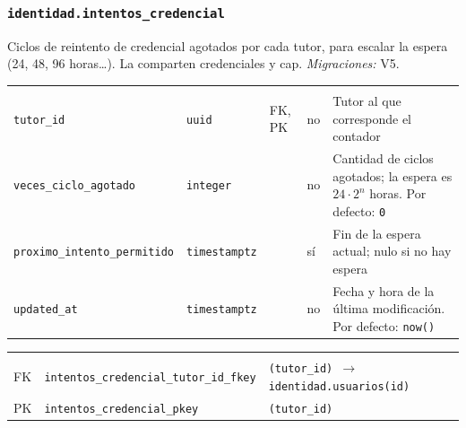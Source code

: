 \subsubsection{\texorpdfstring{\texttt{identidad.intentos\_\allowbreak{}credencial}}{identidad.intentos\_credencial}}\label{dd:identidad.intentos_credencial}

Ciclos de reintento de credencial agotados por cada tutor, para escalar la espera (24, 48, 96 horas\ldots). La comparten credenciales y \gls{cap}. \emph{Migraciones:} V5.

{\small
\begin{xltabular}{\textwidth}{@{}>{\raggedright\arraybackslash}p{3.6cm} >{\raggedright\arraybackslash}p{2.3cm} >{\raggedright\arraybackslash}p{1cm} >{\centering\arraybackslash}p{0.85cm} L@{}}
    \toprule
     &  &  &  &  \\
    \midrule
    \endfirsthead
    \toprule
     &  &  &  &  \\
    \midrule
    \endhead
    \bottomrule
    \endfoot
    \texttt{tutor\_\allowbreak{}id} & \texttt{uuid} & FK, PK & no & Tutor al que corresponde el contador \\
    \texttt{veces\_\allowbreak{}ciclo\_\allowbreak{}agotado} & \texttt{integer} &  & no & Cantidad de ciclos agotados; la espera es $24 \cdot 2^n$ horas. Por defecto: \texttt{0} \\
    \texttt{proximo\_\allowbreak{}intento\_\allowbreak{}permitido} & \texttt{timestamptz} &  & sí & Fin de la espera actual; nulo si no hay espera \\
    \texttt{updated\_\allowbreak{}at} & \texttt{timestamptz} &  & no & Fecha y hora de la última modificación. Por defecto: \texttt{now(\allowbreak{})} \\
\end{xltabular}
}

{\small
\begin{xltabular}{\textwidth}{@{}>{\raggedright\arraybackslash}p{1.7cm} >{\raggedright\arraybackslash}p{4.6cm} L@{}}
    \toprule
     &  &  \\
    \midrule
    \endfirsthead
    \toprule
     &  &  \\
    \midrule
    \endhead
    \bottomrule
    \endfoot
    FK & \texttt{intentos\_\allowbreak{}credencial\_\allowbreak{}tutor\_\allowbreak{}id\_\allowbreak{}fkey} & \texttt{(\allowbreak{}tutor\_\allowbreak{}id) $\rightarrow$ identidad.usuarios(\allowbreak{}id)} \\
    PK & \texttt{intentos\_\allowbreak{}credencial\_\allowbreak{}pkey} & \texttt{(\allowbreak{}tutor\_\allowbreak{}id)} \\
\end{xltabular}
}

